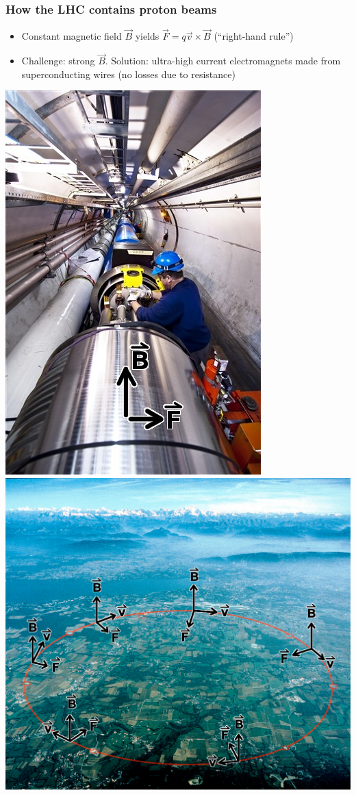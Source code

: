 \documentclass[compress]{beamer}
\begin{document}
\begin{frame}
\frametitle{How the LHC contains proton beams}

\begin{itemize}
\item Constant magnetic field $\vec{B}$ yields $\vec{F} = q\vec{v} \times \vec{B}$ (``right-hand rule'')

\item Challenge: strong $\vec{B}$.  Solution: ultra-high current
  electromagnets made from superconducting wires (no losses due to
  resistance)
\end{itemize}

\includegraphics[height=6 cm]{lhc_dipole.jpg} \hfill
\includegraphics[height=6 cm]{cernpanorama_bfield.jpg}
\end{frame}
\end{document}
